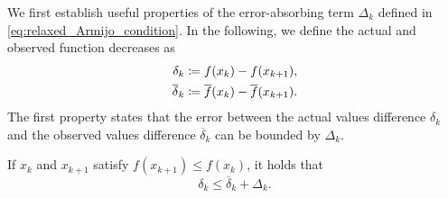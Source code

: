 \documentclass[journal]{subfiles}
\begin{document}
We first establish useful properties of the error-absorbing term $\Delta_k$ defined in \cref{eq:relaxed_Armijo_condition}.
In the following, we define the actual and observed function decreases as
\begin{align}
    \delta_k            & \coloneqq f(x_k) - f(x_{k+1}),           \label{eq:def_small_delta_k}                      \\
    \overline{\delta}_k & \coloneqq \overline{f}(x_k) - \overline{f}(x_{k+1}). \label{eq:def_overline_small_delta_k}
\end{align}
The first property states that the error between the actual values difference $\delta_k$ and the observed values difference $\overline{\delta}_k$ can be bounded by $\Delta_k$.
\begin{lemma}\label{lem:error_bound_on_function_evaluations}
    If $x_k$ and $x_{k+1}$ satisfy $f(x_{k+1}) \le f(x_k)$, it holds that
    \begin{equation*}
        \delta_k \leq \overline{\delta}_k + \Delta_k.
    \end{equation*}
\end{lemma}
\end{document}
